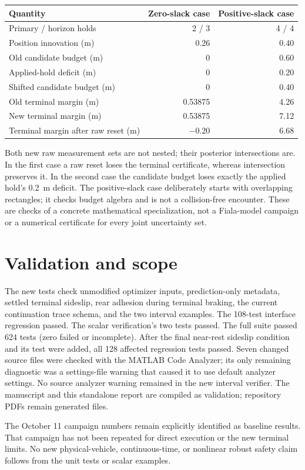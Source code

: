 \documentclass[11pt]{article}
\begin{document}
\begin{center}
\begin{tabular}{lrr}
\toprule
Quantity & Zero-slack case & Positive-slack case\\
\midrule
Primary / horizon holds & 2 / 3 & 4 / 4\\
Position innovation (m) & 0.26 & 0.40\\
Old candidate budget (m) & 0 & 0.60\\
Applied-hold deficit (m) & 0 & 0.20\\
Shifted candidate budget (m) & 0 & 0.40\\
Old terminal margin (m) & 0.53875 & 4.26\\
New terminal margin (m) & 0.53875 & 7.12\\
Terminal margin after raw reset (m) & $-0.20$ & 6.68\\
\bottomrule
\end{tabular}
\end{center}
Both new raw measurement sets are not nested; their posterior intersections
are. In the first case a raw reset loses the terminal certificate, whereas
intersection preserves it. In the second case the candidate budget loses
exactly the applied hold's 0.2~m deficit. The positive-slack case deliberately starts with overlapping rectangles;
it checks budget algebra and is not a collision-free encounter. These are
checks of a concrete mathematical specialization, not a Fiala-model campaign or a numerical
certificate for every joint uncertainty set.

\section{Validation and scope}
The new tests check unmodified optimizer inputs, prediction-only metadata,
settled terminal sideslip, rear adhesion during terminal braking, the
current continuation trace schema, and the two interval examples. The
108-test interface regression passed. The scalar verification's two tests
passed. The full suite passed 624 tests (zero failed or incomplete). After the
final near-rest sideslip condition and its test were added, all 128 affected
regression tests passed. Seven changed source files were checked with the
MATLAB Code Analyzer; its only remaining diagnostic was a settings-file
warning that caused it to use default analyzer settings. No source
analyzer warning remained in the new interval verifier. The manuscript and this standalone
report are compiled as validation; repository PDFs remain generated files.

The October 11 campaign numbers remain explicitly identified as baseline
results. That campaign has not been repeated for direct execution or the
new terminal limits. No new physical-vehicle, continuous-time, or nonlinear
robust safety claim follows from the unit tests or scalar examples.
\end{document}

